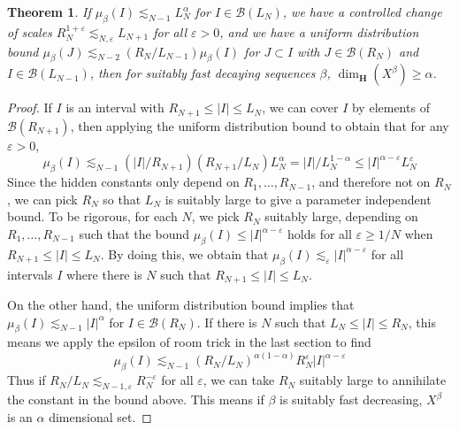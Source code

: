 \documentclass{report}
\theoremstyle{plain}
\theoremstyle{plain}
\newtheorem{theorem}{Theorem}
\newtheorem*{remark}{Remark}
\begin{document}
\begin{theorem}
    If $\mu_\beta(I) \lesssim_{N-1} L_N^\alpha$ for $I \in \mathcal{B}(L_N)$, we have a controlled change of scales $R_N^{1 + \varepsilon} \lesssim_{N,\varepsilon} L_{N+1}$ for all $\varepsilon > 0$, and we have a uniform distribution bound $\mu_\beta(J) \lesssim_{N-2} (R_N/L_{N-1}) \mu_\beta(I)$ for $J \subset I$ with $J \in \mathcal{B}(R_N)$ and $I \in \mathcal{B}(L_{N-1})$, then for suitably fast decaying sequences $\beta$, $\dim_{\mathbf{H}}(X^\beta) \geq \alpha$.
\end{theorem}
\begin{proof}
    If $I$ is an interval with $R_{N+1} \leq |I| \leq L_N$, we can cover $I$ by elements of $\mathcal{B}(R_{N+1})$, then applying the uniform distribution bound to obtain that for any $\varepsilon > 0$,
    \[ \mu_\beta(I) \lesssim_{N-1} (|I|/R_{N+1}) (R_{N+1}/L_N) L_N^\alpha = |I| / L_N^{1 - \alpha} \leq |I|^{\alpha - \varepsilon} L_N^\varepsilon \]
    Since the hidden constants only depend on $R_1, \dots, R_{N-1}$, and therefore not on $R_N$, we can pick $R_N$ so that $L_N$ is suitably large to give a parameter independent bound. To be rigorous, for each $N$, we pick $R_N$ suitably large, depending on $R_1, \dots, R_{N-1}$ such that the bound $\mu_\beta(I) \leq |I|^{\alpha - \varepsilon}$ holds for all $\varepsilon \geq 1/N$ when $R_{N+1} \leq |I| \leq L_N$. By doing this, we obtain that $\mu_\beta(I) \lesssim_\varepsilon |I|^{\alpha - \varepsilon}$ for all intervals $I$ where there is $N$ such that $R_{N+1} \leq |I| \leq L_N$.

    On the other hand, the uniform distribution bound implies that $\mu_\beta(I) \lesssim_{N-1} |I|^\alpha$ for $I \in \mathcal{B}(R_N)$. If there is $N$ such that $L_N \leq |I| \leq R_N$, this means we apply the epsilon of room trick in the last section to find
%
\[ \mu_\beta(I) \lesssim_{N-1} \left( R_N/L_N \right)^{\alpha(1 - \alpha)} R_N^\varepsilon |I|^{\alpha - \varepsilon} \]
%
Thus if $R_N/L_N \lesssim_{N-1,\varepsilon} R_N^{-\varepsilon}$ for all $\varepsilon$, we can take $R_N$ suitably large to annihilate the constant in the bound above. This means if $\beta$ is suitably fast decreasing, $X^\beta$ is an $\alpha$ dimensional set.
\end{proof}

\end{document}
